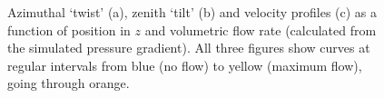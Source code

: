 \begin{figure}
\begin{center}
\end{center}
\caption[Simulated twist, tilt and velocity profiles (uniform state)]{\label{fig:uniform_twist_tilt_profile} Azimuthal `twist' (a), zenith `tilt' (b) and velocity profiles (c) as a function of position in $z$ and volumetric flow rate (calculated from the simulated pressure gradient). All three figures show curves at regular intervals from blue (no flow) to yellow (maximum flow), going through orange.}
\end{figure}

